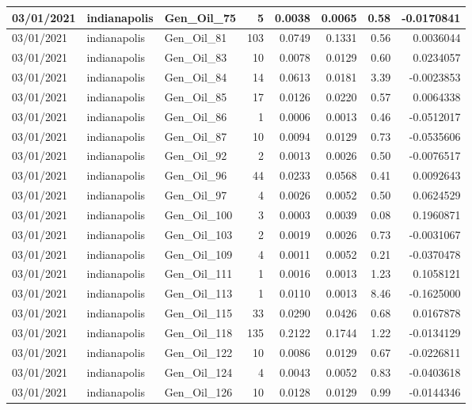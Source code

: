\documentclass[
  letterpaper,
  DIV=11,
  numbers=noendperiod]{scrartcl}
\begin{document}
\begin{tabular}{l|l|l|r|r|r|r|r}
\hline
03/01/2021 & indianapolis & Gen\_Oil\_75 & 5 & 0.0038 & 0.0065 & 0.58 & -0.0170841\\
\hline
03/01/2021 & indianapolis & Gen\_Oil\_81 & 103 & 0.0749 & 0.1331 & 0.56 & 0.0036044\\
\hline
03/01/2021 & indianapolis & Gen\_Oil\_83 & 10 & 0.0078 & 0.0129 & 0.60 & 0.0234057\\
\hline
03/01/2021 & indianapolis & Gen\_Oil\_84 & 14 & 0.0613 & 0.0181 & 3.39 & -0.0023853\\
\hline
03/01/2021 & indianapolis & Gen\_Oil\_85 & 17 & 0.0126 & 0.0220 & 0.57 & 0.0064338\\
\hline
03/01/2021 & indianapolis & Gen\_Oil\_86 & 1 & 0.0006 & 0.0013 & 0.46 & -0.0512017\\
\hline
03/01/2021 & indianapolis & Gen\_Oil\_87 & 10 & 0.0094 & 0.0129 & 0.73 & -0.0535606\\
\hline
03/01/2021 & indianapolis & Gen\_Oil\_92 & 2 & 0.0013 & 0.0026 & 0.50 & -0.0076517\\
\hline
03/01/2021 & indianapolis & Gen\_Oil\_96 & 44 & 0.0233 & 0.0568 & 0.41 & 0.0092643\\
\hline
03/01/2021 & indianapolis & Gen\_Oil\_97 & 4 & 0.0026 & 0.0052 & 0.50 & 0.0624529\\
\hline
03/01/2021 & indianapolis & Gen\_Oil\_100 & 3 & 0.0003 & 0.0039 & 0.08 & 0.1960871\\
\hline
03/01/2021 & indianapolis & Gen\_Oil\_103 & 2 & 0.0019 & 0.0026 & 0.73 & -0.0031067\\
\hline
03/01/2021 & indianapolis & Gen\_Oil\_109 & 4 & 0.0011 & 0.0052 & 0.21 & -0.0370478\\
\hline
03/01/2021 & indianapolis & Gen\_Oil\_111 & 1 & 0.0016 & 0.0013 & 1.23 & 0.1058121\\
\hline
03/01/2021 & indianapolis & Gen\_Oil\_113 & 1 & 0.0110 & 0.0013 & 8.46 & -0.1625000\\
\hline
03/01/2021 & indianapolis & Gen\_Oil\_115 & 33 & 0.0290 & 0.0426 & 0.68 & 0.0167878\\
\hline
03/01/2021 & indianapolis & Gen\_Oil\_118 & 135 & 0.2122 & 0.1744 & 1.22 & -0.0134129\\
\hline
03/01/2021 & indianapolis & Gen\_Oil\_122 & 10 & 0.0086 & 0.0129 & 0.67 & -0.0226811\\
\hline
03/01/2021 & indianapolis & Gen\_Oil\_124 & 4 & 0.0043 & 0.0052 & 0.83 & -0.0403618\\
\hline
03/01/2021 & indianapolis & Gen\_Oil\_126 & 10 & 0.0128 & 0.0129 & 0.99 & -0.0144346\\

\end{tabular}
\end{document}
